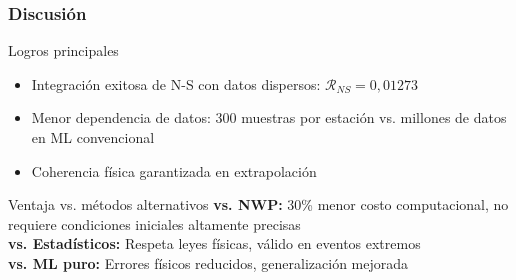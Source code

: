\begin{frame}[fragile]
  \frametitle{Discusión}
  
  \begin{block}{Logros principales}
    \begin{itemize}
      \item Integración exitosa de N-S con datos dispersos: $\mathcal{R}_{NS} = 0{,}01273$
      \item Menor dependencia de datos: 300 muestras por estación vs. millones de datos en ML convencional
      \item Coherencia física garantizada en extrapolación
    \end{itemize}
  \end{block}
  
  \begin{block}{Ventaja vs. métodos alternativos}
    \textbf{vs. NWP:} 30\% menor costo computacional, no requiere condiciones iniciales altamente precisas\\
    \textbf{vs. Estadísticos:} Respeta leyes físicas, válido en eventos extremos\\
    \textbf{vs. ML puro:} Errores físicos reducidos, generalización mejorada
  \end{block}
  
\end{frame}
